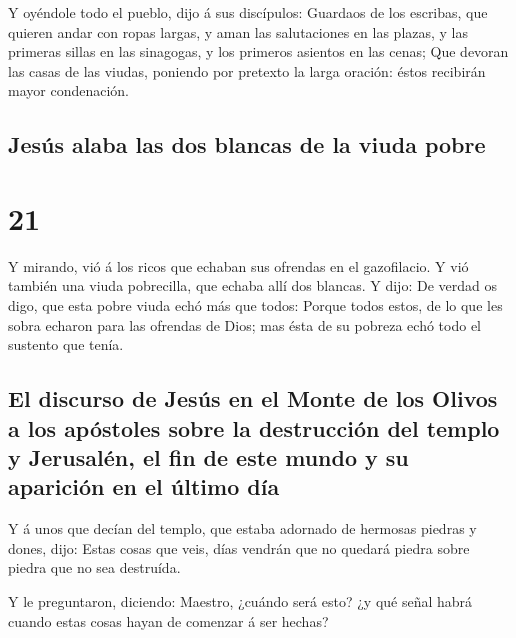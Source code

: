  Y oyéndole todo el pueblo, dijo á sus discípulos:
 Guardaos de los escribas, que quieren andar con ropas
largas, y aman las salutaciones en las plazas, y las primeras sillas en
las sinagogas, y los primeros asientos en las cenas;  Que
devoran las casas de las viudas, poniendo por pretexto la larga oración:
éstos recibirán mayor condenación.

\hypertarget{jesuxfas-alaba-las-dos-blancas-de-la-viuda-pobre}{%
\subsection{Jesús alaba las dos blancas de la viuda
pobre}\label{jesuxfas-alaba-las-dos-blancas-de-la-viuda-pobre}}

\hypertarget{section-20}{%
\section{21}\label{section-20}}

 Y mirando, vió á los ricos que echaban sus ofrendas en el
gazofilacio.  Y vió también una viuda pobrecilla, que
echaba allí dos blancas.  Y dijo: De verdad os digo, que
esta pobre viuda echó más que todos:  Porque todos estos,
de lo que les sobra echaron para las ofrendas de Dios; mas ésta de su
pobreza echó todo el sustento que tenía.

\hypertarget{el-discurso-de-jesuxfas-en-el-monte-de-los-olivos-a-los-apuxf3stoles-sobre-la-destrucciuxf3n-del-templo-y-jerusaluxe9n-el-fin-de-este-mundo-y-su-apariciuxf3n-en-el-uxfaltimo-duxeda}{%
\subsection{El discurso de Jesús en el Monte de los Olivos a los
apóstoles sobre la destrucción del templo y Jerusalén, el fin de este
mundo y su aparición en el último
día}\label{el-discurso-de-jesuxfas-en-el-monte-de-los-olivos-a-los-apuxf3stoles-sobre-la-destrucciuxf3n-del-templo-y-jerusaluxe9n-el-fin-de-este-mundo-y-su-apariciuxf3n-en-el-uxfaltimo-duxeda}}

 Y á unos que decían del templo, que estaba adornado de
hermosas piedras y dones, dijo:  Estas cosas que veis,
días vendrán que no quedará piedra sobre piedra que no sea destruída.

 Y le preguntaron, diciendo: Maestro, ¿cuándo será esto?
¿y qué señal habrá cuando estas cosas hayan de comenzar á ser hechas?

